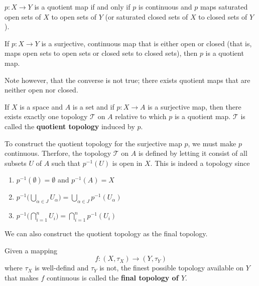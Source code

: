     \begin{definition}
    $p: X \longrightarrow Y$ is a quotient map if and only if $p$ is continuous and $p$ maps saturated open sets of $X$ to open sets of $Y$ (or saturated closed sets of $X$ to closed sets of $Y$). 
    \end{definition}

    \begin{proposition}
    If $p: X \longrightarrow Y$ is a surjective, continuous map that is either open or closed (that is, maps open sets to open sets or closed sets to closed sets), then $p$ is a quotient map. 

    Note however, that the converse is not true; there exists quotient maps that are neither open nor closed. 
    \end{proposition}

    \begin{definition}
    If $X$ is a space and $A$ is a set and if $p: X \longrightarrow A$ is a surjective map, then there exists exactly one topology $\mathscr{T}$ on $A$ relative to which $p$ is a quotient map. $\mathscr{T}$ is called the \textbf{quotient topology} induced by $p$. 
    \end{definition}

    To construct the quotient topology for the surjective map $p$, we must make $p$ continuous. Therfore, the topology $\mathscr{T}$ on $A$ is defined by letting it consist of all subsets $U$ of $A$ such that $p^{-1}(U)$ is open in $X$. This is indeed a topology since
    \begin{enumerate}
        \item $p^{-1} (\emptyset) = \emptyset$ and $p^{-1}(A) = X$
        \item $p^{-1} \Big( \bigcup_{\alpha \in J} U_\alpha \Big) = \bigcup_{\alpha \in J} p^{-1} (U_\alpha)$
        \item $p^{-1} \Big( \bigcap_{i=1}^n U_i \Big) = \bigcap_{i=1}^n p^{-1} (U_i)$
    \end{enumerate}

    We can also construct the quotient topology as the final topology. 

    \begin{definition}
    Given a mapping 
    \[f: (X, \tau_X) \longrightarrow (Y, \tau_Y)\]
    where $\tau_X$ is well-defind and $\tau_Y$ is not, the finest possible topology available on $Y$ that makes $f$ continuous is called the \textbf{final topology of $Y$}. 
    \end{definition}

